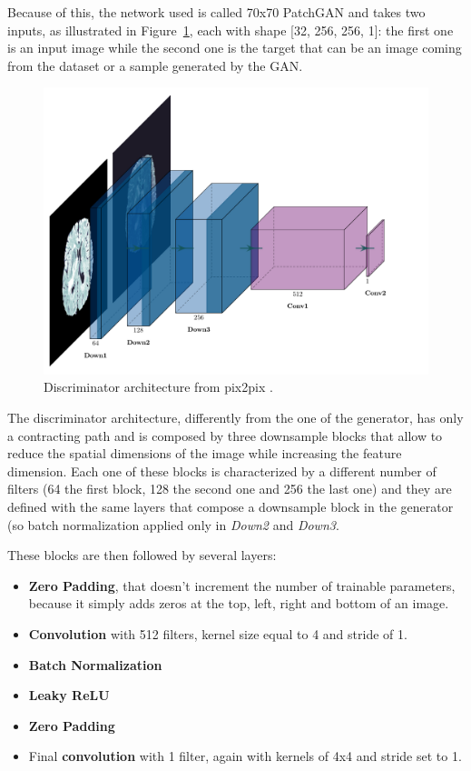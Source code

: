 \vspace{2mm} %
Because of this, the network used is called 70x70 PatchGAN and takes two inputs, as illustrated in Figure~\ref{fig:pix2pix_discriminator}, each with shape [32, 256, 256, 1]: the first one is an input image while the second one is the target that can be an image coming from the dataset or a sample  generated by the \ac{GAN}. 

\begin{figure}[H]
\centering
\includegraphics[height=0.3\textheight]{images/pix2pix_discriminator.pdf}
\caption[Discriminator architecture from pix2pix]{Discriminator architecture from pix2pix \cite{pix2pix}.}
\label{fig:pix2pix_discriminator}
\end{figure}

\vspace{2mm} %
The discriminator architecture, differently from the one of the generator, has only a contracting path and is composed by three downsample blocks that allow to reduce the spatial dimensions of the image while increasing the feature dimension. Each one of these blocks is characterized by a different number of filters (64 the first block, 128 the second one and 256 the last one) and they are defined with the same layers that compose a downsample block in the generator (so batch normalization applied only in \textit{Down2} and \textit{Down3}.


These blocks are then followed by several layers: 

\begin{itemize}
\item \textbf{Zero Padding}, that doesn't increment the number of trainable parameters, because it simply adds zeros at the top, left, right and bottom of an image.
\item \textbf{Convolution} with 512 filters, kernel size equal to 4 and stride of 1.
\item \textbf{Batch Normalization}
\item \textbf{Leaky ReLU}
\item \textbf{Zero Padding}
\item Final \textbf{convolution} with 1 filter, again with kernels of 4x4 and stride set to 1.
\end{itemize}

